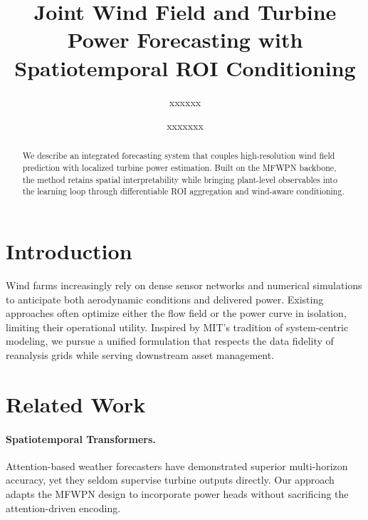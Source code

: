 \documentclass[sigconf]{acmart}
\begin{document}
\title{Joint Wind Field and Turbine Power Forecasting with Spatiotemporal ROI Conditioning}

\author{xxxxxx}

\author{xxxxxxx}

\renewcommand{\shortauthors}{xxx and xxxx}

\begin{abstract}
We describe an integrated forecasting system that couples high-resolution wind field prediction with localized turbine power estimation. Built on the MFWPN backbone, the method retains spatial interpretability while bringing plant-level observables into the learning loop through differentiable ROI aggregation and wind-aware conditioning.
\end{abstract}


\maketitle

\section{Introduction}
Wind farms increasingly rely on dense sensor networks and numerical simulations to anticipate both aerodynamic conditions and delivered power. Existing approaches often optimize either the flow field or the power curve in isolation, limiting their operational utility. Inspired by MIT's tradition of system-centric modeling, we pursue a unified formulation that respects the data fidelity of reanalysis grids while serving downstream asset management.

\section{Related Work}
\paragraph{Spatiotemporal Transformers.} Attention-based weather forecasters have demonstrated superior multi-horizon accuracy, yet they seldom supervise turbine outputs directly. Our approach adapts the MFWPN design to incorporate power heads without sacrificing the attention-driven encoding.
\end{document}
